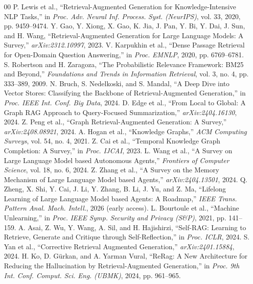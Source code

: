 \documentclass[conference]{IEEEtran}
\begin{document}
\begin{thebibliography}{00}
\scriptsize
\setlength{\itemsep}{0pt plus 1pt}
 P. Lewis et al., ``Retrieval-Augmented Generation for Knowledge-Intensive NLP Tasks,'' in \emph{Proc. Adv. Neural Inf. Process. Syst. (NeurIPS)}, vol. 33, 2020, pp. 9459--9474.
 Y. Gao, Y. Xiong, X. Gao, K. Jia, J. Pan, Y. Bi, Y. Dai, J. Sun, and H. Wang, ``Retrieval-Augmented Generation for Large Language Models: A Survey,'' \emph{arXiv:2312.10997}, 2023.
 V. Karpukhin et al., ``Dense Passage Retrieval for Open-Domain Question Answering,'' in \emph{Proc. EMNLP}, 2020, pp. 6769--6781.
 S. Robertson and H. Zaragoza, ``The Probabilistic Relevance Framework: BM25 and Beyond,'' \emph{Foundations and Trends in Information Retrieval}, vol. 3, no. 4, pp. 333--389, 2009.
 N. Bruch, S. Nedelkoski, and S. Mandal, ``A Deep Dive into Vector Stores: Classifying the Backbone of Retrieval-Augmented Generation,'' in \emph{Proc. IEEE Int. Conf. Big Data}, 2024.
 D. Edge et al., ``From Local to Global: A Graph RAG Approach to Query-Focused Summarization,'' \emph{arXiv:2404.16130}, 2024.
 Z. Peng et al., ``Graph Retrieval-Augmented Generation: A Survey,'' \emph{arXiv:2408.08921}, 2024.
 A. Hogan et al., ``Knowledge Graphs,'' \emph{ACM Computing Surveys}, vol. 54, no. 4, 2021.
 Z. Cai et al., ``Temporal Knowledge Graph Completion: A Survey,'' in \emph{Proc. IJCAI}, 2023.
 L. Wang et al., ``A Survey on Large Language Model based Autonomous Agents,'' \emph{Frontiers of Computer Science}, vol. 18, no. 6, 2024.
 Z. Zhang et al., ``A Survey on the Memory Mechanism of Large Language Model based Agents,'' \emph{arXiv:2404.13501}, 2024.
 Q. Zheng, X. Shi, Y. Cai, J. Li, Y. Zhang, B. Li, J. Yu, and Z. Ma, ``Lifelong Learning of Large Language Model based Agents: A Roadmap,'' \emph{IEEE Trans. Pattern Anal. Mach. Intell.}, 2026 (early access).
 L. Bourtoule et al., ``Machine Unlearning,'' in \emph{Proc. IEEE Symp. Security and Privacy (S\&P)}, 2021, pp. 141--159.
 A. Asai, Z. Wu, Y. Wang, A. Sil, and H. Hajishirzi, ``Self-RAG: Learning to Retrieve, Generate and Critique through Self-Reflection,'' in \emph{Proc. ICLR}, 2024.
 S. Yan et al., ``Corrective Retrieval Augmented Generation,'' \emph{arXiv:2401.15884}, 2024.
 H. Ko, D. G{\"u}rkan, and A. Yarman Vural, ``ReRag: A New Architecture for Reducing the Hallucination by Retrieval-Augmented Generation,'' in \emph{Proc. 9th Int. Conf. Comput. Sci. Eng. (UBMK)}, 2024, pp. 961--965.

\end{thebibliography}
\end{document}
